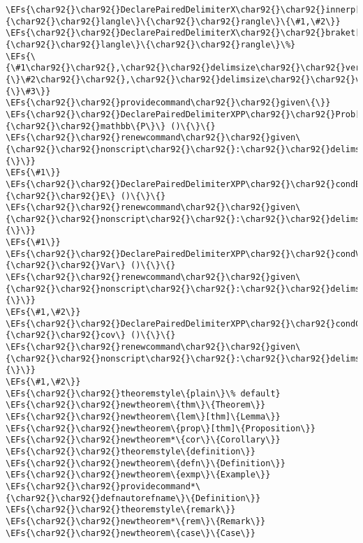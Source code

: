 \documentclass[c]{article}
\theoremstyle{plain}%
\theoremstyle{definition}
\theoremstyle{remark}
\newcommand{\EFs}[1]{\textcolor{EFs}{#1}} %
\begin{document}
\begin{Code}
\begin{Verbatim}
\EFs{\char92{}\char92{}DeclarePairedDelimiterX\char92{}\char92{}innerp[2]\{\char92{}\char92{}langle\}\{\char92{}\char92{}rangle\}\{\#1,\#2\}}
\EFs{\char92{}\char92{}DeclarePairedDelimiterX\char92{}\char92{}braket[3]\{\char92{}\char92{}langle\}\{\char92{}\char92{}rangle\}\%}
\EFs{\{\#1\char92{}\char92{},\char92{}\char92{}delimsize\char92{}\char92{}vert\char92{}\char92{},\char92{}\char92{}mathopen\{\}\#2\char92{}\char92{},\char92{}\char92{}delimsize\char92{}\char92{}vert\char92{}\char92{},\char92{}\char92{}mathopen\{\}\#3\}}
\EFs{\char92{}\char92{}providecommand\char92{}\char92{}given\{\}}
\EFs{\char92{}\char92{}DeclarePairedDelimiterXPP\char92{}\char92{}Prob[1]\{\char92{}\char92{}mathbb\{P\}\} ()\{\}\{}
\EFs{\char92{}\char92{}renewcommand\char92{}\char92{}given\{\char92{}\char92{}nonscript\char92{}\char92{}:\char92{}\char92{}delimsize\char92{}\char92{}vert\char92{}\char92{}nonscript\char92{}\char92{}:\char92{}\char92{}mathopen\{\}\}}
\EFs{\#1\}}
\EFs{\char92{}\char92{}DeclarePairedDelimiterXPP\char92{}\char92{}condE[1]\{\char92{}\char92{}E\} ()\{\}\{}
\EFs{\char92{}\char92{}renewcommand\char92{}\char92{}given\{\char92{}\char92{}nonscript\char92{}\char92{}:\char92{}\char92{}delimsize\char92{}\char92{}vert\char92{}\char92{}nonscript\char92{}\char92{}:\char92{}\char92{}mathopen\{\}\}}
\EFs{\#1\}}
\EFs{\char92{}\char92{}DeclarePairedDelimiterXPP\char92{}\char92{}condVar[2]\{\char92{}\char92{}Var\} ()\{\}\{}
\EFs{\char92{}\char92{}renewcommand\char92{}\char92{}given\{\char92{}\char92{}nonscript\char92{}\char92{}:\char92{}\char92{}delimsize\char92{}\char92{}vert\char92{}\char92{}nonscript\char92{}\char92{}:\char92{}\char92{}mathopen\{\}\}}
\EFs{\#1,\#2\}}
\EFs{\char92{}\char92{}DeclarePairedDelimiterXPP\char92{}\char92{}condCov[2]\{\char92{}\char92{}cov\} ()\{\}\{}
\EFs{\char92{}\char92{}renewcommand\char92{}\char92{}given\{\char92{}\char92{}nonscript\char92{}\char92{}:\char92{}\char92{}delimsize\char92{}\char92{}vert\char92{}\char92{}nonscript\char92{}\char92{}:\char92{}\char92{}mathopen\{\}\}}
\EFs{\#1,\#2\}}
\EFs{\char92{}\char92{}theoremstyle\{plain\}\% default}
\EFs{\char92{}\char92{}newtheorem\{thm\}\{Theorem\}}
\EFs{\char92{}\char92{}newtheorem\{lem\}[thm]\{Lemma\}}
\EFs{\char92{}\char92{}newtheorem\{prop\}[thm]\{Proposition\}}
\EFs{\char92{}\char92{}newtheorem*\{cor\}\{Corollary\}}
\EFs{\char92{}\char92{}theoremstyle\{definition\}}
\EFs{\char92{}\char92{}newtheorem\{defn\}\{Definition\}}
\EFs{\char92{}\char92{}newtheorem\{exmp\}\{Example\}}
\EFs{\char92{}\char92{}providecommand*\{\char92{}\char92{}defnautorefname\}\{Definition\}}
\EFs{\char92{}\char92{}theoremstyle\{remark\}}
\EFs{\char92{}\char92{}newtheorem*\{rem\}\{Remark\}}
\EFs{\char92{}\char92{}newtheorem\{case\}\{Case\}}



\end{Verbatim}
\end{Code}
\end{document}
